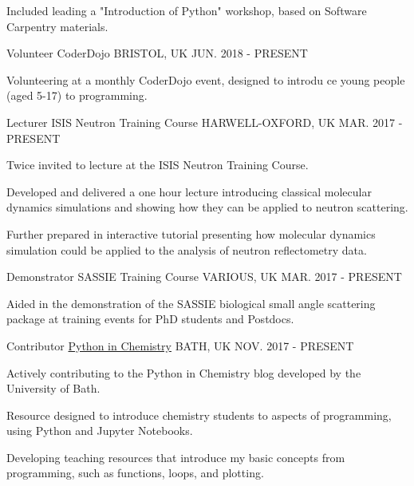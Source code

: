 \begin{cventries}
{\begin{cvitems}
			\item {Included leading a "Introduction of Python" workshop, based on Software Carpentry materials. }
		\end{cvitems}
	}
	\cventry
	{Volunteer}
	{CoderDojo}
	{BRISTOL, UK}
	{JUN. 2018 - PRESENT}
	{
	    \begin{cvitems}
	        \item {Volunteering at a monthly CoderDojo event, designed to introdu    ce young people (aged 5-17) to programming.}
	    \end{cvitems}
	}
	\cventry
	{Lecturer}
	{ISIS Neutron Training Course}
	{HARWELL-OXFORD, UK}
	{MAR. 2017 - PRESENT}
	{
		\begin{cvitems}
			\item {Twice invited to lecture at the ISIS Neutron Training Course.}
			\item {Developed and delivered a one hour lecture introducing classical molecular dynamics simulations and showing how they can be applied to neutron scattering.}
			\item {Further prepared in interactive tutorial presenting how molecular dynamics simulation could be applied to the analysis of neutron reflectometry data.}
		\end{cvitems}
	}
	\cventry
	{Demonstrator}
	{SASSIE Training Course}
	{VARIOUS, UK}
	{MAR. 2017 - PRESENT}
	{
		\begin{cvitems}
			\item {Aided in the demonstration of the SASSIE biological small angle scattering package at training events for PhD students and Postdocs.}
		\end{cvitems}
	}
	\cventry
	{Contributor}
	{\href{http://blogs.bath.ac.uk/python/}{Python in Chemistry}}
	{BATH, UK}
	{NOV. 2017 - PRESENT}
	{
		\begin{cvitems}
			\item {Actively contributing to the Python in Chemistry blog developed by the University of Bath.}
			\item {Resource designed to introduce chemistry students to aspects of programming, using Python and Jupyter Notebooks.}
			\item {Developing teaching resources that introduce my basic concepts from programming, such as functions, loops, and plotting.}
		\end{cvitems}
	}
\end{cventries}



